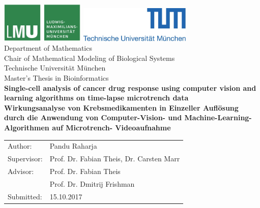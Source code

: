 \documentclass[pdftex,12pt,a4paper]{report}
\begin{document}
\begin{titlepage}
{\sffamily


\begin{center}
\includegraphics[width=0.3\textwidth]{logo2.jpg}
\hfill
\includegraphics[width=0.4\textwidth]{logo1.jpg}  
\\[1.5cm]  

{\Large Department of Mathematics}\\[0.5cm]
{\Large Chair of Mathematical Modeling of Biological Systems}\\[0.5cm]
{Technische Universit\"at M\"unchen}\\[1cm]

{\Large Master's Thesis in Bioinformatics}\\[2cm]
{\textbf{\Large Single-cell analysis of cancer drug response using computer vision and learning algorithms on time-lapse microtrench data}}\\[2cm]
{\textbf{\Large Wirkungsanalyse von Krebsmedikamenten in Einzeller Aufl\"osung durch die Anwendung von Computer-Vision- und Machine-Learning-Algorithmen auf Microtrench- Videoaufnahme}}\\[4cm]

\end{center}
\begin{center}\Large
  \begin{tabular}{ll}
    Author:& Pandu Raharja\\
    Supervisor: &  Prof. Dr. Fabian Theis, Dr. Carsten Marr\\
    Advisor:        &  Prof. Dr. Fabian Theis\\
    & Prof. Dr. Dmitrij Frishman\\
    Submitted:     &  15.10.2017
  \end{tabular}
\end{center}

}%

\end{titlepage}


\end{document}
